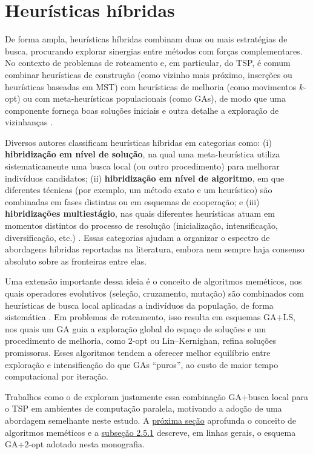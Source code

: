 \section{Heurísticas híbridas}\label{sec-24-heuristicas-hibridas}

De forma ampla, heurísticas híbridas combinam duas ou mais estratégias
de busca, procurando explorar sinergias entre métodos com forças
complementares. No contexto de problemas de roteamento e, em particular,
do TSP, é comum combinar heurísticas de construção (como vizinho mais
próximo, inserções ou heurísticas baseadas em MST) com heurísticas de
melhoria (como movimentos \(k\)-opt) ou com meta-heurísticas
populacionais (como GAs), de modo que uma componente forneça boas
soluções iniciais e outra detalhe a exploração de vizinhanças
\autocite{voudouris1999tsp}.

Diversos autores classificam heurísticas híbridas em categorias como:
(i) \textbf{hibridização em nível de solução}, na qual uma
meta-heurística utiliza sistematicamente uma busca local (ou outro
procedimento) para melhorar indivíduos candidatos; (ii)
\textbf{hibridização em nível de algoritmo}, em que diferentes técnicas
(por exemplo, um método exato e um heurístico) são combinadas em fases
distintas ou em esquemas de cooperação; e (iii) \textbf{hibridizações
  multiestágio}, nas quais diferentes heurísticas atuam em momentos
distintos do processo de resolução (inicialização, intensificação,
diversificação, etc.) \autocite{larranaga1999genetic,voudouris1999tsp}.
Essas categorias ajudam a organizar o espectro de abordagens híbridas
reportadas na literatura, embora nem sempre haja consenso absoluto sobre
as fronteiras entre elas.

Uma extensão importante dessa ideia é o conceito de algoritmos
meméticos, nos quais operadores evolutivos (seleção, cruzamento,
mutação) são combinados com heurísticas de busca local aplicadas a
indivíduos da população, de forma sistemática
\autocite{larranaga1999genetic}. Em problemas de roteamento, isso
resulta em esquemas GA+LS, nos quais um GA guia a exploração global do
espaço de soluções e um procedimento de melhoria, como \(2\)-opt ou
Lin--Kernighan, refina soluções promissoras. Esses algoritmos tendem a
oferecer melhor equilíbrio entre exploração e intensificação do que GAs
``puros'', ao custo de maior tempo computacional por iteração.

Trabalhos como o de \textcite{fujimoto2011highly} exploram justamente
essa combinação GA+busca local para o TSP em ambientes de computação
paralela, motivando a adoção de uma abordagem semelhante neste estudo. A
\hyperref[sec-25-algoritmos-memeticos]{próxima seção} aprofunda o
conceito de algoritmos meméticos e a \hyperref[sec-251-ga-2opt]{subseção
  2.5.1} descreve, em linhas gerais, o esquema GA+\(2\)-opt adotado nesta
monografia.

